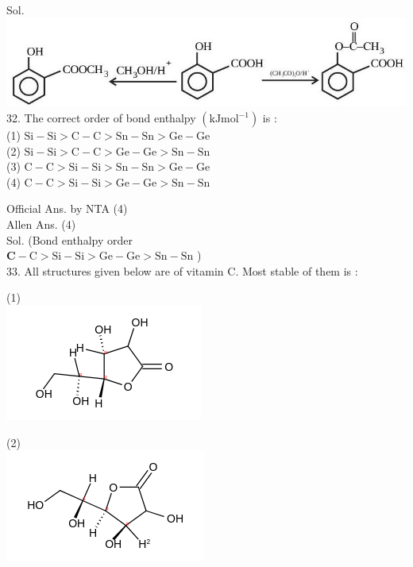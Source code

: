 \documentclass[10pt]{article}
\begin{document}
Sol.\\
\includegraphics[max width=\textwidth, center]{2025_10_02_a54bf82dc4585184bb5fg-1}\\
32. The correct order of bond enthalpy \(\left(\mathrm{kJ} \mathrm{mol}^{-1}\right)\) is :\\
(1) \(\mathrm{Si}-\mathrm{Si}>\mathrm{C}-\mathrm{C}>\mathrm{Sn}-\mathrm{Sn}>\mathrm{Ge}-\mathrm{Ge}\)\\
(2) \(\mathrm{Si}-\mathrm{Si}>\mathrm{C}-\mathrm{C}>\mathrm{Ge}-\mathrm{Ge}>\mathrm{Sn}-\mathrm{Sn}\)\\
(3) \(\mathrm{C}-\mathrm{C}>\mathrm{Si}-\mathrm{Si}>\mathrm{Sn}-\mathrm{Sn}>\mathrm{Ge}-\mathrm{Ge}\)\\
(4) \(\mathrm{C}-\mathrm{C}>\mathrm{Si}-\mathrm{Si}>\mathrm{Ge}-\mathrm{Ge}>\mathrm{Sn}-\mathrm{Sn}\)

Official Ans. by NTA (4)\\
Allen Ans. (4)\\
Sol. (Bond enthalpy order\\
\(\mathbf{C}-\mathrm{C}>\mathrm{Si}-\mathrm{Si}>\mathrm{Ge}-\mathrm{Ge}>\mathrm{Sn}-\mathrm{Sn}\) )\\
33. All structures given below are of vitamin C. Most stable of them is :

(1)\\
\includegraphics{smile-e9257e05ba6d1bc40b30b0f94db7b025474e320a}

(2)\\
\includegraphics{smile-085a61e78305b71548050924c9b838180d91797c}
\end{document}
